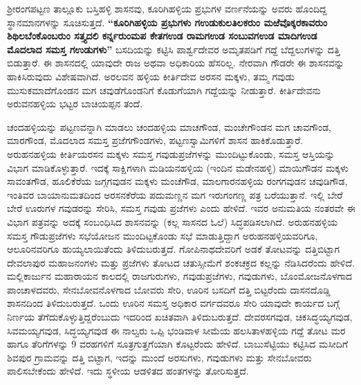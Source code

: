 ಶ‍್ರೀರಂಗಪಟ್ಟಣ ತಾಲ್ಲೂಕು ಬಸ್ತಿಹಳ್ಳಿ ಶಾಸನವು, ಕೂರಿಗಿಹಳ್ಳಿಯ ಪ್ರಭುಗಳ ವರ್ಣನೆಯನ್ನು ಅವರು ಹೊಂದಿದ್ದ ಸ್ಥಾನಮಾನ\-ಗಳನ್ನು ಸೂಚಿಸುತ್ತದೆ. \textbf{“ಕೂರಿಗಿಹಳ್ಳಿಯ ಪ್ರಭುಗಳು ಗಉಡುಕುಲತಿಲಕರುಂ ಮಱೆವೊಕ್ಕರಕಾವರುಂ ಶಿಥಿಲ\-ಬೆಂಕೊಂಬರುಂ ಸತ್ತ್ಯದಲಿ ಕರ್ನ್ನರುಂಮಪ ಕೇತಗಉಡ ರಾಮಗಉಡ ಸಂಬುವಗಉಡ ಮಾದಿಗಉಡ ಮೊದಲಾದ ಸಮಸ್ತ ಗಉಡುಗಳು”} ಬಸದಿಯನ್ನು ಕಟ್ಟಿಸಿ ಪಾರ್ಶ್ವದೇವರ ಅಮೃತಪಡಿಗೆ ಗದ್ದೆ ಬೆದ್ದಲುಗಳನ್ನು ದತ್ತಿ ಬಿಡುತ್ತಾರೆ. ಈ ಶಾಸನದಲ್ಲಿ ಯಾವುದೇ ರಾಜ ಅಥವಾ ಅಧಿಕಾರಿಯ ಹೆಸರಿಲ್ಲ. ನೇರವಾಗಿ ಗೌಡರೇ ಈ ಶಾಸನವನ್ನು ಹಾಕಿಸಿರುವುದು ವಿಶೇಷವಾಗಿದೆ. \hbox{ಅರಲವನ} ಹಳ್ಳಿಯ ಕೀರ್ತಿದೇವ ಅರಸನ ಮಕ್ಕಳು, ತಮ್ಮ ಗವುಡು ಮುಸುಕಮಾದೆಗೊಂಡನ ಮಗ ಚವುಡೆಗೊಂಡನಿಗೆ ಕೊಡುಗೆಯಾಗಿ ಗದ್ದೆಯನ್ನು ನೀಡುತ್ತಾರೆ. ಕೀರ್ತಿದೇವನು ಅರುವನಹಳ್ಳಿಯ ಭಟ್ಟರ ಬಾಚಿಯಪ್ಪನ ತಂದೆ.

ಚಂದಹಳ್ಳಿಯನ್ನು ಪಟ್ಟಣವನ್ನಾಗಿ ಮಾಡಲು ಚಂದಹಳ್ಳಿಯ ಮಾಚಗೌಂಡ, ಮಂಚೇಗೌಂಡನ ಮಗ ಚಾವಗೌಂಡ, ಮಾರಗೌಂಡ, ಮೊದಲಾದ ಸಮಸ್ತ ಪ್ರಜೆಗಗೌಂಡಗಳು, ಪಟ್ಟಣಸ್ವಾಮಿಗಳಿಗೆ ಶಾಸನ ಹಾಕಿಕೊಡುತ್ತಾರೆ. ಅರುಹನಹಳ್ಳಿಯ ಕೀರ್ತಿಯರಸನ ಮಕ್ಕಳು ಸಮಸ್ತ ಗವುಡುಪ್ರಜೆಗಳನ್ನು ಮುಂದಿಟ್ಟುಕೊಂಡು, ಸಮಸ್ತ ಆಸ್ತಿಯನ್ನು ವಿಭಾಗ ಮಾಡಿಕೊಳ್ಳುತ್ತಾರೆ. ಇದಕ್ಕೆ ಸಾಕ್ಷಿಗಳಾಗಿ ಮಡಿಯನಹಳ್ಳಿಯ (ಇಂದಿನ ಮಡೇನಹಳ್ಳಿ) ಮಾಯಿಗೌಡನ ಮಕ್ಕಳು ಸಾವಂತಗೌಡ, ಹೂಲಿಕೆರೆಯ ಜಗ್ಗಗವುಡನ ಮಕ್ಕಳು ಮಂಚೆಗೌಡ, ಮಾಲಗಾರನಹಳ್ಳಿಯ ರಂಗಗವುಡನ ಚವುಡಿಗೌಡ, ಇಂತಿವರ ಬಾಯಾನುಮತದಿಂದ ಅರಸನಕೆರೆಯ ಪದುಮಣ್ಣನ ಮಗ ಇರುಗಂಗಣ್ಣ ಪತ್ರ ಬರೆಯುತ್ತಾನೆ. ಇಲ್ಲಿ ಬೇರೆ ಬೇರೆ ಊರುಗಳ ಗವುಡರನ್ನು ಸೇರಿಸಿ, ಸಮಸ್ತ ಗವುಡು ಪ್ರಜೆಗಳು ಎಂದು ಹೇಳಿದೆ. ಇವರ ಅನುಮತಿಯ ನಂತರವೇ ಈ ವಿಭಾಗ ಪತ್ರವನ್ನು ಅದಕ್ಕೆ ಸಂಬಂಧಿಸಿದ ಶಾಸನವನ್ನು (ಕಲ್ಲ ಸಾಸನದ ಓಲೆ) ಸಿದ್ಧಪಡಿಸಲಾಗಿದೆ. ಅರುಹನಹಳ್ಳಿಯ ಸಮಸ್ತ ಗೌಡುಪ್ರಜೆಗಳು ಸಭೆಯೋಜನ ಮುಂದಿಟ್ಟಕೊಂಡು ಸಭೆ ಮಾಡುತ್ತಿದ್ದಾಗ ಅರುಹನಹಳ್ಳಿಯವರಿಗೂ, ಆಲೂರಿನವರಿಗೂ ಹುಯ್ಯಲಾಯಿತೆಂದು ತಿಳಿದುಬರುತ್ತದೆ. ಗೋಪಿನಾಥ\-ದೇವರಿಗೆ ಅಡಕೆ ತೋಟವನ್ನು ದತ್ತಿಬಿಟ್ಟಾಗ ದೇವಲಾಪುರ ಮಹಾಜನಂಗಳು ಮತ್ತು ಪ್ರಜೆಗಳು ತೋಟದ ಚತುಸ್ಸೀಮೆಗೆ ಶಂಕಚಕ್ರದ ಕಲ್ಲನ್ನು ನೆಡಿಸಿದರೆಂದು ಹೇಳಿದೆ. ಮಲ್ಲಿಕಾರ್ಜುನ ಮಹಾರಾಯನ ಕಾಲದಲ್ಲಿ ರಾಜಗುರುಗಳು, ಗವುಡುಪ್ರಜೆಗಳು, ಗವುಡುಗಳು, ಬೊಂಮೋಜನೊಳಗಾದ ಪಾಂಚಾಳದವರು, ಸೇನಬೋವನೊಳಗಾದ ಬೋವರು ಸೇರಿ, ಊರಿನ ಬಸದಿಗೆ ದತ್ತಿ ಬಿಟ್ಟರೆಂದು ದಾಸನದೊಡ್ಡಿ ಶಾಸನದಿಂದ ತಿಳಿದುಬರುತ್ತದೆ. ಒಂದು ಊರಿನ ಸಮಸ್ತ ಅಧಿಕಾರ ವರ್ಗದವರೂ ಸೇರಿ ಯಾವುದೇ ಕಾರ್ಯದ ಬಗ್ಗೆ ನಿರ್ಣಯ ತೆಗೆದುಕೊಳ್ಳುತ್ತಿದ್ದರೆಂಬುದು ಇದರಿಂದ ಖಚಿತವಾಗಿ ತಿಳಿದು\-ಬರುತ್ತದೆ. ದೇವರಸಗವುಡ, ಚಿಕಸಿದ್ಧಯ್ಯಗವುಡ, ಸಿವಮಯ್ಯಗವುಡ, ಸಿದ್ಧಯ್ಯಗವುಡ ಈ ನಾಲ್ವರು ಒಪ್ಪಿ ಭಂಡಿವಾಳ ಸೀಮೆಯ ಹಲಸಿತಾಳಹಳ್ಳಿಯ ಗದ್ದೆ ತೋಟ ಮರ ಹಾಗೂ ತೆರಿಗೆಗಳನ್ನು 9 ವರಹಗಳಿಗೆ ಸೂತ್ರಗುತ್ತಗೆಯಾಗಿ ಕೊಟ್ಟರೆಂದು ಹೇಳಿದೆ. ಬಾಬುಸೆಟ್ಟಿಯು ಕಟ್ಟಿಸಿದ ಮಸೀದಿಗೆ ಶಿವಪುರ ಗ್ರಾಮವನ್ನು ದತ್ತಿ ಬಿಟ್ಟಾಗ, ಇದನ್ನು ಮುಂದೆ ಅರಸುಗಳು, ಗವುಡುಗಳು ಮತ್ತು ಸೇನಬೋವರು ಪಾಲಿಸಬೇಕೆಂದು ಹೇಳಿದೆ. ಇದು ಸ್ಥಳೀಯ ಆಡಳಿತದ ಹಂತಗಳನ್ನು ತೋರಿಸುತ್ತದೆ.



